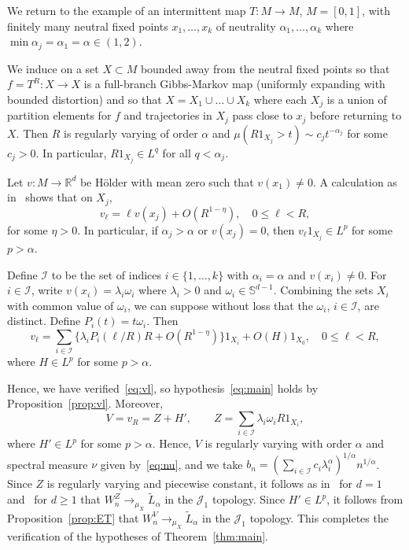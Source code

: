 \documentclass[12pt]{article}
\numberwithin{equation}{section}
\newcommand{\R}{{\mathbb R}}
\newcommand{\bbS}{{\mathbb S}}
\newcommand{\cI}{{\mathcal I}}
\newcommand{\cJ}{{\mathcal J}}
\newcommand{\tL}{{\tilde L}}
\begin{document}
\begin{example} \label{ex:4+}
We return to the example of an intermittent map
$T:M\to M$, $M=[0,1]$, with finitely many neutral fixed points
$x_1,\dots,x_k$ of neutrality $\alpha_1,\dots,\alpha_k$ where
$\min\alpha_j=\alpha_1=\alpha\in(1,2)$.

We induce on a set $X\subset M$ bounded away from the neutral fixed points so
that $f=T^R:X\to X$ is a full-branch Gibbs-Markov map (uniformly expanding with bounded distortion) and so that $X=X_1\cup\dots\cup X_k$ where
each $X_j$ is a union of partition elements for $f$ and
trajectories in $X_j$ pass close to $x_j$ before returning to $X$.
Then $R$ is regularly varying of order $\alpha$ and
$\mu(R1_{X_j}>t)\sim c_j t^{-\alpha_j}$ for some $c_j>0$. In particular,
$R1_{X_j}\in L^q$ for all $q<\alpha_j$.

Let $v:M\to\R^d$ be H\"older with mean zero such that $v(x_1)\neq0$.
A calculation as in~\cite{Gouezel04,MZ15,CFKM20} shows that on $X_j$,
\[
v_\ell = \ell v(x_j) +O(R^{1-\eta}), \quad 0\le \ell<R,
\]
for some $\eta>0$.
In particular, if $\alpha_j>\alpha$ or $v(x_j)=0$, then
$v_\ell 1_{X_j}\in L^p$ for some $p>\alpha$.

Define $\cI$ to be the set of indices $i\in\{1,\dots,k\}$ with $\alpha_i=\alpha$ and $v(x_i)\neq0$. For $i\in\cI$, write $v(x_i)=\lambda_i\omega_i$ where $\lambda_i>0$ and
$\omega_i\in\bbS^{d-1}$.
Combining the sets $X_i$ with common value of $\omega_i$, we can suppose without loss that the $\omega_i$, $i\in\cI$, are distinct.
Define $P_i(t)=t \omega_i$.
Then
\[
v_\ell  
 = \sum_{i\in\cI}\{ \lambda_i P_i(\ell/R)R +O(R^{1-\eta})\}1_{X_i} +O(H)1_{X_0}, \quad 0\le \ell<R,
\]
where $H\in L^p$ for some $p>\alpha$.

Hence, we have verified~\eqref{eq:vl}, so hypothesis~\eqref{eq:main} holds by
Proposition~\ref{prop:vl}.
Moreover,
\[
V=v_R=Z+H', \qquad 
Z=\sum_{i\in\cI}\lambda_i\omega_i R 1_{X_i},
\]
where $H'\in L^p$ for some $p>\alpha$.
Hence, $V$ is regularly varying with order $\alpha$ and spectral measure $\nu$ given by~\eqref{eq:nu}, and we take $b_n=(\sum_{i\in\cI}c_i\lambda_i^\alpha)^{1/\alpha}n^{1/\alpha}$.
Since $Z$ is regularly varying and piecewise constant, it follows as
in~\cite{TyranKaminska10,MZ15} for $d=1$ and~\cite{CFKM20} for $d\ge1$ that
$W_n^Z\to_{\mu_X} \tL_\alpha$ in the $\cJ_1$ topology.
Since $H'\in L^p$, it follows from Proposition~\ref{prop:ET} that $W_n^V\to_{\mu_X} \tL_\alpha$ in the $\cJ_1$ topology.
This completes the verification of the hypotheses of Theorem~\ref{thm:main}.
\end{example}
\end{document}
